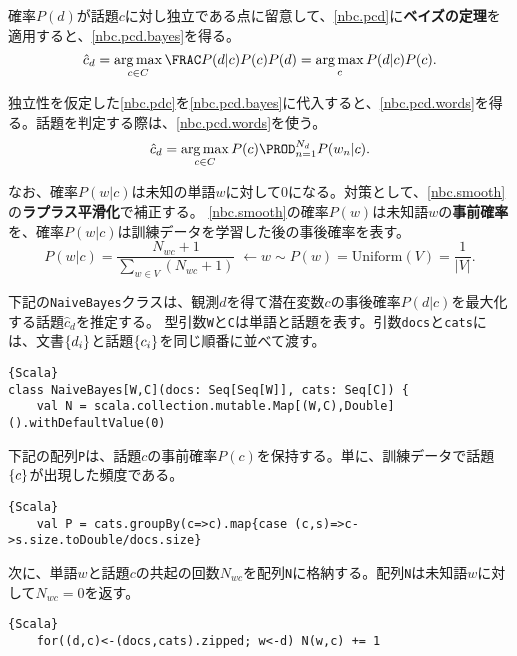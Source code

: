 \documentclass[10pt,a4paper]{book}
\begin{document}
確率$P(d)$が話題$c$に対し独立である点に留意して、\eqref{nbc.pcd}に\textbf{ベイズの定理}を適用すると、\eqref{nbc.pcd.bayes}を得る。
%
\begin{equation}
\label{eq:nbc.pcd.bayes}
\hat{c}_d = \argmax_{c \in C} \frac{P(d|c)P(c)}{P(d)} = \argmax_c P(d|c)P(c).
\end{equation}

独立性を仮定した\eqref{nbc.pdc}を\eqref{nbc.pcd.bayes}に代入すると、\eqref{nbc.pcd.words}を得る。話題を判定する際は、\eqref{nbc.pcd.words}を使う。
%
\begin{equation}
\label{eq:nbc.pcd.words}
\hat{c}_d = \argmax_{c \in C} P(c) \prod_{n=1}^{N_d} P(w_n|c).
\end{equation}

なお、確率$P(w|c)$は未知の単語$w$に対して$0$になる。対策として、\eqref{nbc.smooth}の\textbf{ラプラス平滑化}で補正する。
\eqref{nbc.smooth}の確率$P(w)$は未知語$w$の\textbf{事前確率}を、確率$P(w|c)$は訓練データを学習した後の事後確率を表す。
%
\begin{equation}
\label{eq:nbc.smooth}
P(w|c) = \frac{N_{wc}+1}{\sum_{w\in V} (N_{wc}+1)}\;
\leftarrow w \sim P(w) = \mathrm{Uniform}(V) = \frac{1}{|V|}.
\end{equation}

下記の\texttt{NaiveBayes}クラスは、観測$d$を得て潜在変数$c$の事後確率$P(d|c)$を最大化する話題$\hat{c}_d$を推定する。
型引数\texttt{W}と\texttt{C}は単語と話題を表す。引数\texttt{docs}と\texttt{cats}には、文書$\seq{d_i}$と話題$\seq{c_i}$を同じ順番に並べて渡す。

\begin{Verbatim}{Scala}
class NaiveBayes[W,C](docs: Seq[Seq[W]], cats: Seq[C]) {
	val N = scala.collection.mutable.Map[(W,C),Double]().withDefaultValue(0)
\end{Verbatim}

下記の配列\texttt{P}は、話題$c$の事前確率$P(c)$を保持する。単に、訓練データで話題$\seq{c}$が出現した頻度である。

\begin{Verbatim}{Scala}
	val P = cats.groupBy(c=>c).map{case (c,s)=>c->s.size.toDouble/docs.size}
\end{Verbatim}

次に、単語$w$と話題$c$の共起の回数$N_{wc}$を配列\texttt{N}に格納する。配列\texttt{N}は未知語$w$に対して$N_{wc}\!=\!0$を返す。

\begin{Verbatim}{Scala}
	for((d,c)<-(docs,cats).zipped; w<-d) N(w,c) += 1
\end{Verbatim}
\end{document}

